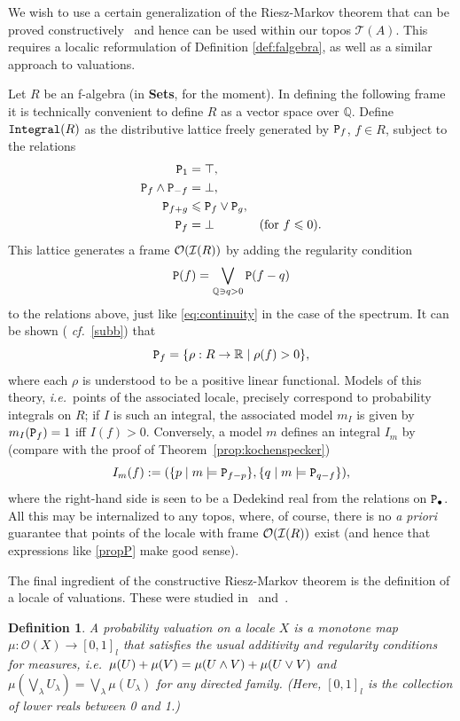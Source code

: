 \documentclass[12pt]{article}
\newcommand{\Q}{\mathbb{Q}}
\newcommand{\beq}{\begin{equation}}
\newcommand{\eeq}{\end{equation}}
\newcommand{\Sets}{\mbox{\textbf{Sets}}}
\newcommand{\raw}{\rightarrow} \newcommand{\rat}{\mapsto}
\newcommand{\er}{\eqref}
\newcommand{\lm}{\lambda} \newcommand{\Lm}{\Lambda}
\newcommand{\rh}{\rho} \newcommand{\sg}{\sigma}
\newcommand{\CO}{{\mathcal O}} \newcommand{\CP}{{\mathcal P}}
\newcommand{\alg}[1]{\ensuremath{#1}}
\newcommand{\asstopos}{\ensuremath{\mathcal{T}}}
\newcommand{\prop}[1]{\ensuremath{\mbox{\texttt{#1}}}}
\newcommand{\TA}{\mathcal{T}(A)}
\newcommand{\ie}{\textit{i.e.}}
\renewcommand{\TA}{\asstopos(\alg{A})}
\newtheorem{definition}[theorem]{Definition}
\begin{document}
We wish to use a certain generalization of the Riesz-Markov theorem that
can be proved
constructively~\cite{Coquand/Spitters:integrals-valuations} and hence
can be used within our topos $\TA$. This requires a localic reformulation of
Definition \ref{def:falgebra}, as well as a similar approach to
valuations.

Let $R$ be an f-algebra (in \Sets, for the moment).  In defining the following
frame it is technically convenient to define $R$ as a vector space over $\Q$.
Define $\prop{Integral}(R)$ as the distributive lattice freely
generated by $\prop{P}_f$, $f\in R$, subject to the
relations
\begin{align*}
                \prop{P}_1&=\top,\\
  \prop{P}_f\wedge \prop{P}_{-f} & =\bot, \\
  \prop{P}_{f+g}            & \leqslant \prop{P}_{f}\vee \prop{P}_g,\\
  \prop{P}_f            & =\bot			& (\mbox{for }f\leqslant 0).
\end{align*}
This lattice generates a
frame $\mathcal{O}({\mathcal I}(R))$ by adding the regularity condition
\beq\prop{P}(f)=\bigvee_{\Q\ni q>0}\prop{P}(f-q)\eeq to the relations above,
just
like \eqref{eq:continuity} in the case of the spectrum. It can be shown ({\it
cf.}\ \er{subb})
that
\beq \prop{P}_f=\{\rho:R\raw \R \mid \rho(f) > 0\},\label{propP}\eeq
where each $\rh$ is understood to be a positive linear functional.
Models of this theory, \ie\ points of the associated locale,  precisely
correspond to probability integrals
on $R$; if $I$ is such an integral, the associated model $m_I$ is given by
$m_I(\prop{P}_f)=1$ iff $I(f)>0$.
Conversely, a model $m$ defines an integral $I_m$ by (compare with the
proof of Theorem~\ref{prop:kochenspecker})
 $$
I_m(f):=(\{p\mid
m\models \prop{P}_{f-p}\}, \{q\mid
m\models \prop{P}_{q-f}\}), $$
where the right-hand side is seen to be a Dedekind real from the
relations on $\prop{P}_\bullet$.
All this may be internalized to any topos, where, of course, there is
no {\it a priori} guarantee that points of the locale with frame
$\mathcal{O}({\mathcal I}(R))$ exist (and hence that expressions like \er{propP} make
good
sense).

The final ingredient of the constructive  Riesz-Markov theorem is the
definition of a locale of valuations. These were studied in~\cite{heckmann}
and~\cite{vickersintegration}.
\begin{definition}
  A {\it probability valuation} on a locale $X$ is a monotone map
  $\mu:\CO(X)\raw [0,1]_l$ that satisfies the usual additivity and
  regularity conditions for measures, \ie\ $\mu(U)+\mu(V)=\mu(U\wedge
  V)+\mu(U\vee V)$ and $\mu(\bigvee_{\lm} U_{\lm}) =\bigvee_{\lm}\mu(
  U_{\lm})$ for any directed family. (Here, $[0,1]_l$ is the
  collection of lower reals between 0 and 1.)
\end{definition}
\end{document}
